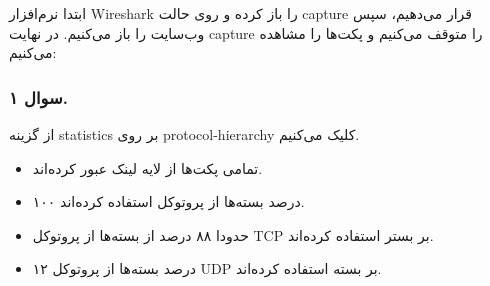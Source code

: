 
ابتدا نرم‌‌افزار Wireshark را باز کرده و روی حالت capture قرار می‌دهیم،
سپس وب‌سایت 
را باز می‌کنیم. در نهایت capture را متوقف می‌کنیم و پکت‌ها را مشاهده می‌کنیم:

{
}


\subsubsection*{سوال ۱.}

از گزینه statistics بر روی protocol-hierarchy کلیک می‌کنیم.


{
}

\begin{itemize}
   \item   تمامی پکت‌ها از لایه لینک عبور کرده‌اند.
   \item ۱۰۰ درصد بسته‌ها از پروتوکل  استفاده کرده‌اند.
   \item حدودا ۸۸ درصد از بسته‌ها از پروتوکل TCP بر بستر  استفاده کرده‌اند.
   \item ۱۲ درصد بسته‌ها از پروتوکل UDP بر بسته  استفاده کرده‌اند.
\end{itemize}

